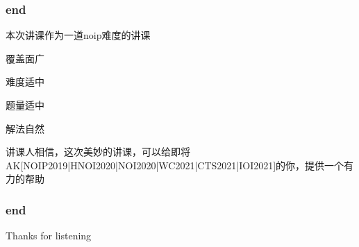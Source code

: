 \documentclass[10pt]{beamer}
\begin{document}
	\clearpage
	\begin{frame}
		\frametitle{end}
		 本次讲课作为一道noip难度的讲课

		 覆盖面广

		 难度适中

		 题量适中

		 解法自然

		 讲课人相信，这次美妙的讲课，可以给即将AK[NOIP2019|HNOI2020|NOI2020|WC2021|CTS2021|IOI2021]的你，提供一个有力的帮助
	\end{frame}
	\clearpage
	\begin{frame}
		\frametitle{end}
		\begin{center}
			\Huge Thanks for listening
		\end{center}
	\end{frame}
\end{document}
